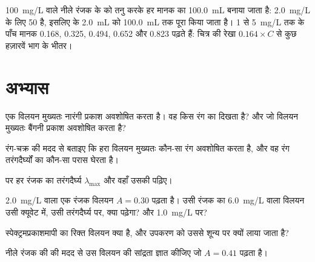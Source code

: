 \begin{example}[पाँच मानक]\label{ex:g11:absorbance:standards}
\qty{100}{mg/L} वाले नीले रंजक के  को तनु करके हर मानक का
\qty{100.0}{mL} बनाया जाता है: \qty{2.0}{mg/L} के लिए  50 है, इसलिए  के \qty{2.0}{mL} को \qty{100.0}{mL} तक पूरा किया जाता है।
1 से \qty{5}{mg/L} तक के पाँच मानक 0.168, 0.325, 0.494,
0.652 और 0.823 पढ़ते हैं: चित्र की रेखा $0.164 \times C$ से कुछ हज़ारवें भाग के
भीतर।
\end{example}

\section{अभ्यास}

\begin{exercise}[$\star$]\label{exo:g11:absorbance:1}
एक विलयन मुख्यतः नारंगी प्रकाश अवशोषित करता है। वह किस रंग का दिखता है? और जो
विलयन मुख्यतः बैंगनी प्रकाश अवशोषित करता है?
\end{exercise}

\begin{exercise}[$\star$]\label{exo:g11:absorbance:2}
रंग-चक्र की मदद से बताइए कि हरा विलयन मुख्यतः कौन-सा रंग अवशोषित करता है, और वह
रंग तरंगदैर्घ्यों का कौन-सा परास घेरता है।
\end{exercise}

\begin{exercise}[$\star$]\label{exo:g11:absorbance:3}
 पर हर रंजक का तरंगदैर्घ्य $\lambda_{\max}$ और वहाँ उसकी
 पढ़िए।
\end{exercise}

\begin{exercise}[$\star$]\label{exo:g11:absorbance:4}
\qty{2.0}{mg/L} वाला एक रंजक विलयन $A = 0.30$ पढ़ता है। उसी रंजक का
\qty{6.0}{mg/L} वाला विलयन उसी क्यूवेट में, उसी तरंगदैर्घ्य पर, क्या
पढ़ेगा? और \qty{1.0}{mg/L} पर?
\end{exercise}

\begin{exercise}[$\star$]\label{exo:g11:absorbance:5}
स्पेक्ट्रमप्रकाशमापी का रिक्त विलयन क्या है, और उपकरण को उससे शून्य पर क्यों लाया
जाता है?
\end{exercise}

\begin{exercise}[$\star\star$]\label{exo:g11:absorbance:6}
नीले रंजक की  की मदद से उस विलयन की सांद्रता ज्ञात कीजिए जो
$A = 0.41$ पढ़ता है।
\end{exercise}

